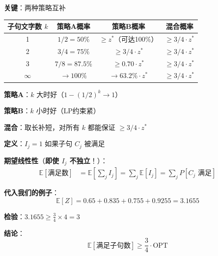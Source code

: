 \documentclass[12pt, a4paper]{ctexart}
\begin{document}
\begin{blackboard}

\textbf{关键}：两种策略互补

\begin{center}
\begin{tabular}{c|c|c|c}
子句文字数 $k$ & 策略A概率 & 策略B概率 & 混合概率 \\
\hline
1 & $1/2 = 50\%$ & $\geq z^*$（可达100\%） & $\geq 3/4 \cdot z^*$ \\
2 & $3/4 = 75\%$ & $\geq 3/4 \cdot z^*$ & $\geq 3/4 \cdot z^*$ \\
3 & $7/8 = 87.5\%$ & $\geq 0.70 \cdot z^*$ & $\geq 3/4 \cdot z^*$ \\
$\infty$ & $\to 100\%$ & $\to 63.2\% \cdot z^*$ & $\geq 3/4 \cdot z^*$
\end{tabular}
\end{center}

\textbf{策略A}：$k$ 大时好（$1-(1/2)^k \to 1$）

\textbf{策略B}：$k$ 小时好（LP约束紧）

\textbf{混合}：取长补短，对所有 $k$ 都能保证 $\geq 3/4 \cdot z^*$

\end{blackboard}

\begin{blackboard}

\textbf{定义}：$I_j = 1$ 如果子句 $C_j$ 被满足

\textbf{期望线性性}（\textbf{即使 $I_j$ 不独立}！）：
\begin{align*}
\mathbb{E}[\text{满足数}] &= \mathbb{E}\left[\sum_j I_j\right] = \sum_j \mathbb{E}[I_j] = \sum_j P[C_j \text{ 满足}]
\end{align*}

\textbf{代入我们的例子}：
\[
\mathbb{E}[Z] = 0.65 + 0.835 + 0.755 + 0.9255 = 3.1655
\]

\textbf{检验}：$3.1655 \geq \frac{3}{4} \times 4 = 3$ \checkmark

\textbf{结论}：
\[
\boxed{\mathbb{E}[\text{满足子句数}] \geq \frac{3}{4} \cdot \text{OPT}}
\]

\end{blackboard}
\end{document}
